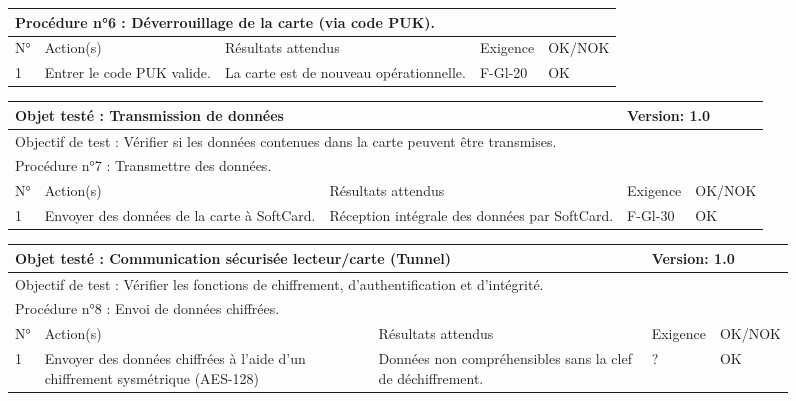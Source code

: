 \documentclass[a4paper,11pt,french]{article}
\begin{document}
\begin{figure}[!h]
\begin{tabular}{|p{1cm}|p{5cm}|p{5cm}|p{2cm}|p{2cm}|}
\hline
\multicolumn{5}{|l|}{Procédure n°6 : Déverrouillage de la carte (via code PUK).} \\
\hline
N° & Action(s) & Résultats attendus & Exigence & OK/NOK \\
\hline
1 & Entrer le code PUK valide. & La carte est de nouveau opérationnelle. & F-Gl-20 & OK \\
\hline
\end{tabular}
\end{figure}


\newpage

\begin{figure}[!h]
\begin{tabular}{|p{1cm}|p{5cm}|p{5cm}|p{2cm}|p{2cm}|}
\hline
\multicolumn{3}{|l|}{Objet testé : Transmission de données} & \multicolumn{2}{|l|}{Version: 1.0} \\
\hline
\multicolumn{5}{|l|}{Objectif de test : Vérifier si les données contenues dans la carte peuvent être transmises.} \\
\hline
\multicolumn{5}{|l|}{Procédure n°7 : Transmettre des données.} \\
\hline
N° & Action(s) & Résultats attendus & Exigence & OK/NOK \\
\hline
1 & Envoyer des données de la carte à SoftCard. & Réception intégrale des données par SoftCard. & F-Gl-30 & OK \\
\hline
\end{tabular}
\end{figure}


\newpage

\begin{figure}[!h]
\begin{tabular}{|p{1cm}|p{5cm}|p{5cm}|p{2cm}|p{2cm}|}
\hline
\multicolumn{3}{|l|}{Objet testé : Communication sécurisée lecteur/carte (Tunnel)} & \multicolumn{2}{|l|}{Version: 1.0} \\
\hline
\multicolumn{5}{|l|}{Objectif de test : Vérifier les fonctions de chiffrement, d'authentification et d'intégrité.} \\
\hline
\multicolumn{5}{|l|}{Procédure n°8 : Envoi de données chiffrées.} \\
\hline
N° & Action(s) & Résultats attendus & Exigence & OK/NOK \\
\hline
1 & Envoyer des données chiffrées à l'aide d'un chiffrement sysmétrique (AES-128) & Données non compréhensibles sans la clef de déchiffrement. & ? & OK \\
\hline
\end{tabular}
\end{figure}
\end{document}
